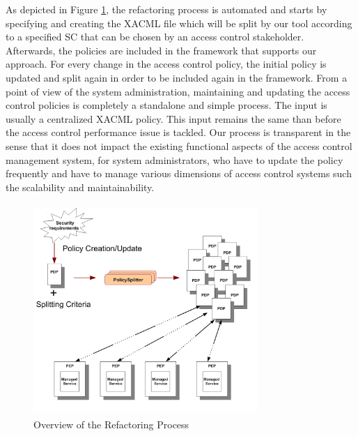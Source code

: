 As depicted in Figure \ref{overallprocess}, the refactoring process is automated and starts by specifying and creating the XACML file which 
will be split by our tool according to a specified SC that can be chosen by an access control stakeholder. Afterwards, the policies are included in the 
framework that supports our approach. For every change in the access control policy, the initial policy is updated and 
split again in order to be included again in the framework.
From a point of view of the system administration, maintaining and updating the access control policies is completely a standalone and simple
 process. The input is usually a centralized XACML policy. This input remains the same than before the access control performance issue is tackled.
Our process is transparent in the sense that it does not impact the existing functional aspects of the access control management system, 
for system administrators, who have to update the policy frequently and have to manage various dimensions of access control 
systems such the scalability and maintainability.
\begin{figure}[!h]
\begin{center}
\includegraphics[width=8.5cm, height=8cm]{Overall-process}
\caption{Overview of the Refactoring Process}
\label{overallprocess}
\end{center}
\end{figure} 

